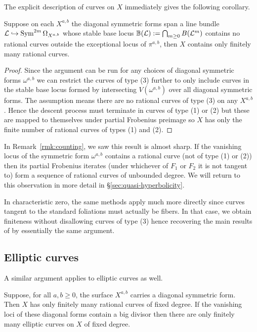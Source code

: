\documentclass[main.tex]{subfiles}
\begin{document}
The explicit description of curves on $X$ immediately gives the following corollary.

\begin{theorem}
Suppose on each $X^{a,b}$ the diagonal symmetric forms span a line bundle $\mathcal{L} \hookrightarrow \operatorname{\mathrm{Sym}}^{2m} \Omega_{X^{a,b}}$  whose stable base locus $\mathbb{B}(\mathcal{L}) := \bigcap_{m \ge 0} B(\mathcal{L}^m)$ contains no rational curves outside the exceptional locus of $\pi^{a,b}$, then $X$ contains only finitely many rational curves.    
\end{theorem}

\begin{proof}
Since the argument can be run for any choices of diagonal symmetric forms $\omega^{a,b}$ we can restrict the curves of type (3) further to only include curves in the stable base locus formed by intersecting $V(\omega^{a,b})$ over all diagonal symmetric forms. 
The assumption means there are no rational curves of type (3) on any $X^{a,b}$. Hence the descent process must terminate in curves of type (1) or (2) but these are mapped to themselves under partial Frobenius preimage so $X$ has only the finite number of rational curves of types (1) and (2). 
\end{proof}

In Remark~\ref{rmk:counting}, we saw this result is almost sharp. If the vanishing locus of the symmetric form $\omega^{a,b}$ contains a rational curve (not of type (1) or (2)) then its partial Frobenius iterates (under whichever of $F_1$ or $F_2$ it is not tangent to) form a sequence of rational curves of unbounded degree. We will return to this observation in more detail in \S\ref{sec:quasi-hyperbolicity}.
\par 
In characteristic zero, the same methods apply much more directly since curves tangent to the standard foliations must actually be fibers. In that case, we obtain finiteness without disallowing curves of type (3) hence recovering the main results of  \cite{church:lang_product_quotient} by essentially the same argument.

\subsection{Elliptic curves}

A similar argument applies to elliptic curves as well. 

\begin{theorem} \label{thm:obstruction_elliptic}
Suppose, for all $a,b \ge 0$, the surface $X^{a,b}$ carries a diagonal symmetric form. Then $X$ has only finitely many rational curves of fixed degree. If the vanishing loci of these diagonal forms contain a big divisor then there are only finitely many elliptic curves on $X$ of fixed degree.
\end{theorem}
\end{document}
